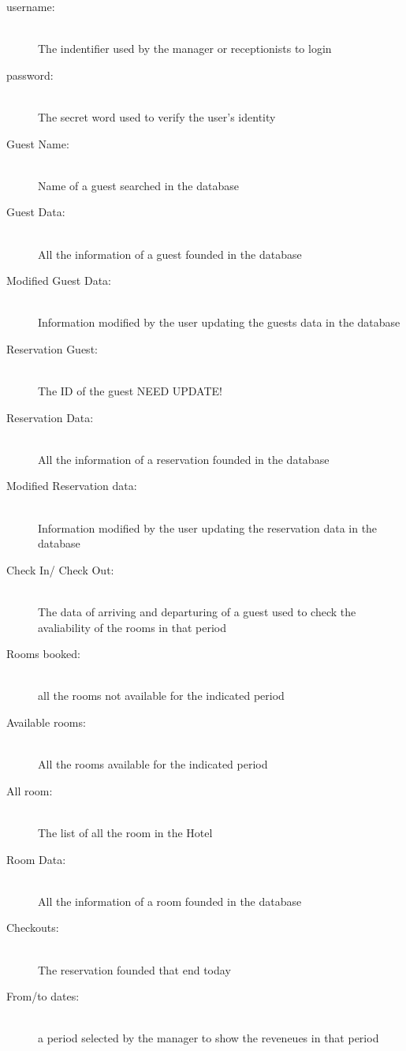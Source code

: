 \begin{description}
    
  \item[username:] \hfill \\ The indentifier used by the manager or receptionists to login 
    
  \item[password:] \hfill \\ The secret word used to verify the user's identity
    
  \item[Guest Name:] \hfill \\ Name of a guest searched in the database
    
  \item[Guest Data:] \hfill \\ All the information of a guest founded in the database
    
  \item[Modified Guest Data:] \hfill \\ Information modified by the user updating the guests data in the database

  \item[Reservation Guest:] \hfill \\ The ID of the guest NEED UPDATE! 
    
  \item[Reservation Data:] \hfill \\ All the information of a reservation founded in the database
    
  \item[Modified Reservation data:] \hfill \\ Information modified by the user updating the reservation data in the database

  \item[Check In/ Check Out:] \hfill \\ The data of arriving and departuring of a guest used to check the avaliability of the rooms in that period
    
  \item[Rooms booked:] \hfill \\ all the rooms not available for the indicated period
    
  \item[Available rooms:] \hfill \\ All the rooms available for the indicated period
    
  \item[All room:] \hfill \\ The list of all the room in the Hotel
    
  \item[Room Data:] \hfill \\ All the information of a room founded in the database
    
  \item[Checkouts:] \hfill \\ The reservation founded that end today
    
  \item[From/to dates:] \hfill \\ a period selected by the manager to show the reveneues in that period
    
\end {description}
